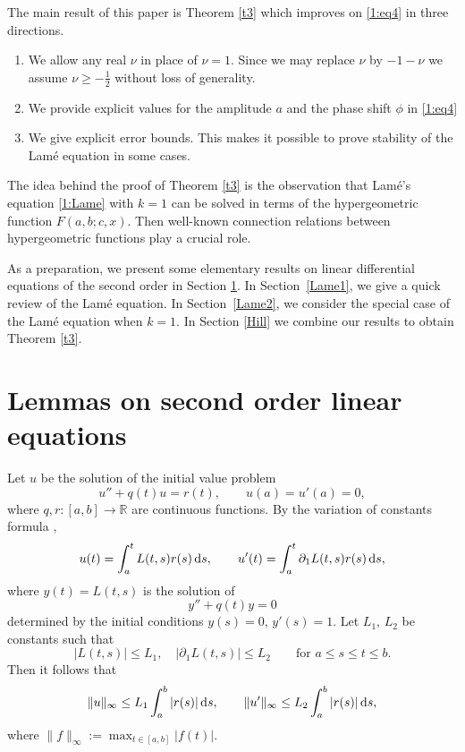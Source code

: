 \documentclass[pdftex]{sigma}
\newcommand{\R}{\mathbb{R}}
\numberwithin{equation}{section}
\begin{document}
The main result of this paper is Theorem \ref{t3}
which improves on \eqref{1:eq4} in three directions.
\begin{enumerate}\itemsep=0pt
\item
We allow any real $\nu$ in place of $\nu=1$. Since we may replace $\nu$ by $-1-\nu$ we assume $\nu\ge -\frac12$ without loss of generality.
\item
We provide explicit values for the amplitude $a$ and the phase shift $\phi$ in \eqref{1:eq4}
\item
We give explicit error bounds. This makes it possible to prove
stability of the Lam\'e equation in some cases.
\end{enumerate}

The idea behind the proof of Theorem \ref{t3} is the observation that Lam\'e's equation \eqref{1:Lame} with $k=1$
can be solved in terms of the hypergeometric function $F(a,b;c,x)$.
Then well-known connection relations between hypergeometric functions play a crucial role.

As a preparation, we present some elementary results on linear differential equations of the second order in
Section \ref{second}.
In Section~\ref{Lame1}, we give a quick review of the Lam\'e equation. In Section~\ref{Lame2}, we consider the special case
of the Lam\'e equation when $k=1$. In Section \ref{Hill} we combine our results to obtain Theorem \ref{t3}.


\section{Lemmas on second order linear equations}\label{second}

Let $u$ be the solution of the initial value problem
\[ u''+q(t)u=r(t),\qquad u(a)=u'(a)=0,\]
where $q,r\colon [a,b]\to\R$ are continuous functions.
By the variation of constants formula \cite[Section~2.6]{C},
\[ u(t)=\int_a^t L(t,s) r(s)\,{\rm d}s,\qquad u'(t)=\int_a^t \partial_1 L(t,s)r(s)\,{\rm d}s,\]
where $y(t)=L(t,s)$ is the solution of
\begin{equation}\label{ode1}
 y''+q(t)y=0
\end{equation}
determined by the initial conditions $y(s)=0$, $y'(s)=1$.
Let $L_1$, $L_2$ be constants such that
\begin{equation}\label{est}
 |L(t,s)|\le L_1,\quad |\partial_1 L(t,s)|\le L_2 \qquad\text{for $a\le s\le t\le b$}.
 \end{equation}
Then it follows that
\begin{equation}\label{est2}
\|u\|_\infty \le L_1 \int_a^b |r(s)|\,{\rm d}s,\qquad \|u'\|_\infty \le L_2 \int_a^b |r(s)|\,{\rm d}s,
\end{equation}
where $\|f\|_\infty:=\max_{t\in[a,b]} |f(t)|$.
\end{document}
